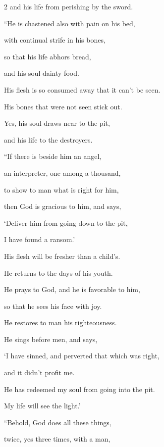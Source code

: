 \begin{multicols}{2}
	and his life from perishing by the sword.
	
		\vspace{\baselineskip}
	
	
	\myverse{}“He is chastened also with pain on his bed,
	
	with continual strife in his bones,
	
	\myverse{}so that his life abhors bread,
	
	and his soul dainty food.
	
	\myverse{}His flesh is so consumed away that it can’t be seen.
	
	His bones that were not seen stick out.
	
	\myverse{}Yes, his soul draws near to the pit,
	
	and his life to the destroyers.
	
		\vspace{\baselineskip}
	
	
	\myverse{}“If there is beside him an angel,
	
	an interpreter, one among a thousand,
	
	to show to man what is right for him,
	
	\myverse{}then God is gracious to him, and says,
	
	‘Deliver him from going down to the pit,
	
	I have found a ransom.’
	
	\myverse{}His flesh will be fresher than a child’s.
	
	He returns to the days of his youth.
	
	\myverse{}He prays to God, and he is favorable to him,
	
	so that he sees his face with joy.
	
	He restores to man his righteousness.
	
	\myverse{}He sings before men, and says,
	
	‘I have sinned, and perverted that which was right,
	
	and it didn’t profit me.
	
	\myverse{}He has redeemed my soul from going into the pit.
	
	My life will see the light.’
	
		\vspace{\baselineskip}
	
	\myverse{}“Behold, God does all these things,
	
	twice, yes three times, with a man,
	

\end{multicols}
